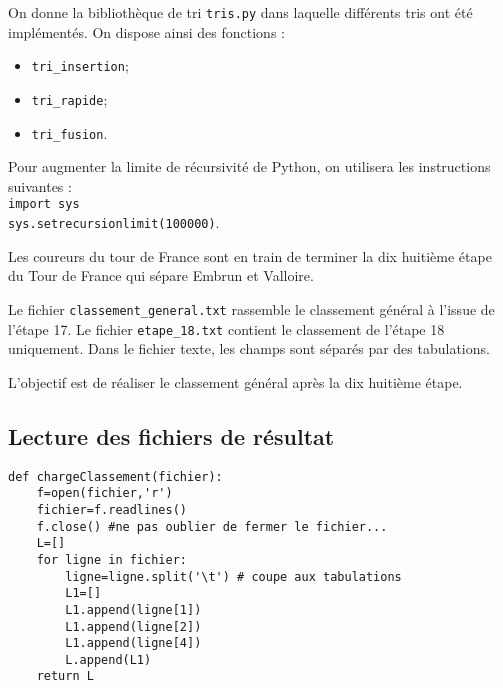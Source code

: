 \setcounter{numques}{0}


On donne la bibliothèque de tri \texttt{tris.py} dans laquelle différents tris ont été implémentés.
On dispose ainsi des fonctions : 
\begin{itemize}
\item \texttt{tri\_insertion};
\item \texttt{tri\_rapide};
\item \texttt{tri\_fusion}.
\end{itemize}

\vspace{0.5cm}

Pour augmenter la limite de récursivité de Python, on utilisera les instructions suivantes :\\
\texttt{import sys}\\
\texttt{sys.setrecursionlimit(100000)}.




Les coureurs du tour de France sont en train de terminer la dix huitième étape du Tour de France qui sépare Embrun et Valloire. 

Le fichier \texttt{classement\_general.txt} rassemble le classement général à l'issue de l'étape 17. Le fichier \texttt{etape\_18.txt} contient le classement de l'étape 18 uniquement. Dans le fichier texte, les champs sont séparés par des tabulations.

\begin{obj}
  L'objectif est de réaliser le classement général après la dix huitième étape.
\end{obj}


\subsection*{Lecture des fichiers de résultat}



\ifprof
\begin{lstlisting}
def chargeClassement(fichier):
    f=open(fichier,'r')
    fichier=f.readlines()
    f.close() #ne pas oublier de fermer le fichier...
    L=[]
    for ligne in fichier:
        ligne=ligne.split('\t') # coupe aux tabulations
        L1=[]
        L1.append(ligne[1])
        L1.append(ligne[2])
        L1.append(ligne[4])
        L.append(L1)
    return L
\end{lstlisting}
\else\fi


